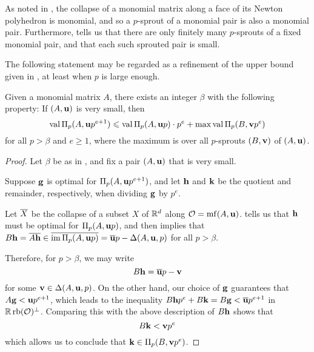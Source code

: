 \documentclass[11pt]{amsart}
\begin{document}
\begin{remark}
\label{p-sprout: R} 
As noted in , the collapse of a monomial matrix along a face of its Newton polyhedron is monomial, and so a $p$-sprout of a monomial pair is also a monomial pair.  Furthermore,    tells us that there are only finitely many $p$-sprouts of a fixed monomial pair, and that each such sprouted pair is small. 
 \end{remark}

The following statement may be regarded as a refinement of the upper bound given in , at least when $p$ is large enough.


\begin{corollary}
Given a monomial matrix $A$, there exists an integer $\beta$ with the following property\textup:  If $(A, \mathbf{u})$ is very small, then
%
\[ \operatorname{val} \Pi_p(A, \mathbf{u}p^{e+1})  \leqslant  \operatorname{val} \Pi_p(A, \mathbf{u}p) \cdot p^e +  \max \operatorname{val} \Pi_p(B, \mathbf{v}p^e) \] 
%
for all $p > \beta$ and $e \geq 1$, where the maximum is over all $p$-sprouts $(B, \mathbf{v})$ of $(A, \mathbf{u})$.  
\end{corollary}

\begin{proof}  Let $\beta$ be as in , and fix a pair $(A, \mathbf{u})$ that is very small.


Suppose $\mathbf{g}$ is optimal for $\Pi_p(A, \mathbf{u}p^{e+1})$, and let $\mathbf{h}$ and $\mathbf{k}$ be the quotient and remainder, respectively, when dividing $\mathbf{g}$ by $p^e$.

Let $\overline{X}$ be the collapse of a subset $X$ of $\mathbb{R}^d$ along $\mathcal{O} = \operatorname{mf}(A, \mathbf{u})$.   tells us that $\mathbf{h}$ must be optimal for $\Pi_p(A, \mathbf{u}p)$, and  then implies that $B \mathbf{h} = \overline{A \mathbf{h}} \in \overline{\operatorname{im} \Pi_p(A, \mathbf{u}p)} = \overline{\mathbf{u}}p - \Delta(A, \mathbf{u}, p)$ for all $p > \beta$.   

Therefore, for $p > \beta$, we may write \[ B \mathbf{h} = \overline{\mathbf{u}}p - \mathbf{v}\] for some $\mathbf{v} \in \Delta(A, \mathbf{u}, p)$.  On the other hand, our choice of $\mathbf{g}$ guarantees that $A \mathbf{g} < \mathbf{u}p^{e+1}$, which leads to the inequality $B \mathbf{h} p^e + B \mathbf{k} = B \mathbf{g} <  \overline{\mathbf{u}}p^{e+1}$  in $\mathbb{R} \operatorname{rb}(\mathcal{O})^{\perp}$.  Comparing this with the above description of $B \mathbf{h}$ shows that \[ B \mathbf{k} < \mathbf{v} p^e \] which allows us to conclude that $\mathbf{k} \in \Pi_p(B, \mathbf{v} p^e)$.  %
\end{proof}
\end{document}
